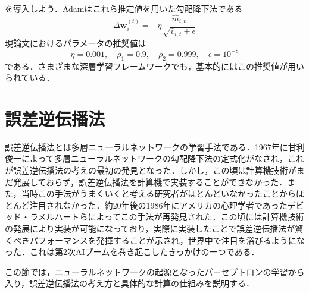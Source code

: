 \documentclass[a4paper,11pt]{jsreport}
\begin{document}
を導入しよう．Adamはこれら推定値を用いた勾配降下法である
\begin{equation}
  \Delta \bm{w}_i^{(t)}
  = -\eta \frac{\hat{m}_{i,t}}{\sqrt{\hat{v}_{i,t} + \epsilon}}
\end{equation}
現論文におけるパラメータの推奨値は
\begin{equation}
  \eta = 0.001, \quad \rho_1 = 0.9, \quad \rho_2 = 0.999, \quad \epsilon = 10^{-8}
\end{equation}
である．さまざまな深層学習フレームワークでも，基本的にはこの推奨値が用いられている．

\section{誤差逆伝播法}
誤差逆伝播法とは多層ニューラルネットワークの学習手法である．1967年に甘利俊一によって多層ニューラルネットワークの勾配降下法の定式化がなされ，これが誤差逆伝播法の考えの最初の発見となった．しかし，この頃は計算機技術がまだ発展しておらず，誤差逆伝播法を計算機で実装することができなかった．また，当時この手法がうまくいくと考える研究者がほとんどいなかったことからほとんど注目されなかった．約20年後の1986年にアメリカの心理学者であったデビッド・ラメルハートらによってこの手法が再発見された．この頃には計算機技術の発展により実装が可能になっており，実際に実装したことで誤差逆伝播法が驚くべきパフォーマンスを発揮することが示され，世界中で注目を浴びるようになった．これは第2次AIブームを巻き起こしたきっかけの一つである．\par
この節では，ニューラルネットワークの起源となったパーセプトロンの学習から入り，誤差逆伝播法の考え方と具体的な計算の仕組みを説明する．
\end{document}
